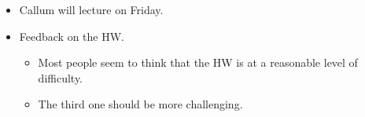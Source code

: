 \documentclass[../notes.tex]{subfiles}
\begin{document}
\begin{itemize}
    \begin{proof}
        We have proven previously that $F$ an integral domain implies $F[X]$ is an integral domain.\par
        Let $I\subset F[X]$ be a nonzero ideal. Let
        \begin{equation*}
            d = \min\{\deg(g):g\in I,\ g\neq 0\}
        \end{equation*}
        Pick $g\in I$ such that $\deg(g)=d$. We have that $g=a_0+\cdots+a_dX^d$, $a_d\neq 0$, $a_d^{-1}\in F$. Let $f=a_d^{-1}g\in I$ (as guaranteed by the presence of $g\in I$). Let $h\in I$. Then the EA produces $q,r$ such that $h=qf+r$ with $\deg(r)<d$. We know that $h,f\in I$. Thus, $h-qf=I$. It follows by the definition of $d$ that $r=0$. Therefore, $h\in(f)$.
    \end{proof}
    \item Callum will lecture on Friday.
    \item Feedback on the HW.
    \begin{itemize}
        \item Most people seem to think that the HW is at a reasonable level of difficulty.
        \item The third one should be more challenging.
    \end{itemize}
\end{itemize}
\end{document}

